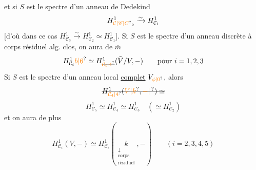 et si $S$ est le spectre d'un anneau de Dedekind
\[
H^1_{\unsure{\mathcal C|\mathscr C|C}_2}\xrightarrow{\sim}H^1_{\mathcal C_1}
\]
[d'où dans ce cas $H^1_{\mathcal C_3}\xrightarrow{\sim}H^1_{\mathcal C_2}\simeq H^1_{\mathcal C_1}$]. Si $S$ est le spectre d'un anneau  discrète à corps résiduel alg. clos,  on aura de $\overline m$
\[
H^1_{\mathcal C_i}\unsure{b|6}\simeq H^1_{\deleted{\unsure{\mathcal C_i|4}}}(\widehat V/V,-)\qquad\text{pour }i=1,2,3
\]
Si $S$ est le spectre d'un anneau local \uline{complet} $V_{\unsure{\phi|0}}$, alors
\[
\deleted{H^1_{\unsure{\mathcal C_4|4}}(\unsure{V|k},\unsure{-|\,})\simeq}
\]
\[
H^1_{\mathcal C_5}\simeq H^1_{\mathcal C_4}\simeq H^1_{\mathcal C_3}\quad(\simeq H^1_{\mathcal C_2})
\]
et on aura de plus
\[
H^1_{\mathcal C_i}(V,-)\simeq H^1_{\mathcal C_i}(\underset{\substack{\downarrow\\\text{corps}\\\text{résiduel}}}{k},-)\qquad(i=2,3,4,5)
\]
